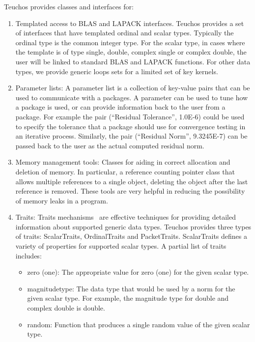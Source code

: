 \documentclass[acmtoms,acmnow]{acmtrans2m}
\begin{document}
Teuchos provides classes and interfaces for:
\begin{enumerate}
\item Templated access to BLAS and LAPACK interfaces.  Teuchos
provides a set of interfaces that
have templated ordinal and scalar types.  Typically the ordinal type
is the common integer type.  For the scalar type, in cases
where the template is of type single, double, complex single or
complex double, the user will be linked to standard BLAS and LAPACK
functions.  For other data types, we provide generic loops sets for a
limited set of key kernels.

\item Parameter lists:  A parameter list is a collection of key-value
pairs that can be used to communicate with a packages.  A parameter
can be used to tune how a package is used, or can provide information
back to the user from a package.  For example the pair (``Residual Tolerance'',
1.0E-6) could be used to specify the tolerance that a package should
use for convergence testing in an iterative process.  Similarly, the
pair (``Residual Norm'', 9.3245E-7) can be passed back to the user as
the actual computed residual norm.  

\item Memory management tools:  Classes for aiding in correct allocation 
and deletion of memory.  In particular, a reference counting pointer class that 
allows multiple references to a single object, deleting the object after the last
reference is removed.  These tools are very helpful in reducing the possibility of
memory leaks in a program.

\item Traits: Traits mechanisms~\cite{MyersTraits} are effective techniques
for providing detailed information about supported generic data types.
Teuchos provides three types of traits: ScalarTraits, OrdinalTraits
and PacketTraits.
ScalarTraits defines a variety of properties for supported scalar
types.  A partial list of traits includes:
\begin{itemize}
\item zero (one): The appropriate value for zero (one) for the given
scalar type.
\item magnitudetype: The data type that would be used by a norm for
the given scalar type.  For example, the magnitude type for double and
complex double is double.
\item random: Function that produces a single random value of the
given scalar type.
\end{itemize}


\end{enumerate}
\end{document}
